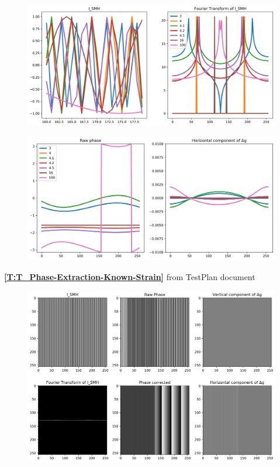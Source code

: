 \documentclass[12pt, titlepage]{article}
\begin{document}
\begin{figure}[H]
\begin{center}
\includegraphics[scale=0.5]{Figures/Test_2_test_cases.png}
\caption{}
\label{fig:Test_2_Test_cases}
\end{center}
\end{figure}

\begin{figure}[H]
\begin{center}
\includegraphics[scale=0.5]{Figures/Test_2_test_results.png}
\caption{}
\label{fig:Test_2_Test_results}
\end{center}
\end{figure}

\textbf{\cref{T:T_Phase-Extraction-Known-Strain}} from TestPlan document

\begin{figure}[H]
\begin{center}
\includegraphics[scale=0.5]{Figures/Test_3_explanation.png}
\caption{}
\label{fig:Test_3_explaination}
\end{center}
\end{figure}
\end{document}
